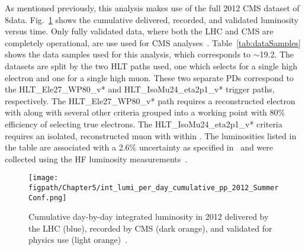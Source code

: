 As mentioned previously, this analysis makes use of the full 2012 CMS dataset of 8\tev data.
Fig.~\ref{fig:int_lumi_per_day} shows the cumulative delivered, recorded, and validated luminosity versus time.
Only fully validated data, where both the LHC and CMS are completely operational, are use used for CMS analyses~\cite{LumiPublic}.
Table~\ref{tab:dataSamples} shows the data samples used for this analysis, which corresponds to $\sim$19.2\fbinv.
The datasets are split by the two HLT paths used, one which selects for a single high \pt electron and one for a single high \pt muon.
These two separate PDs correspond to the HLT\_Ele27\_WP80\_v* and HLT\_IsoMu24\_eta2p1\_v* trigger paths, respectively.
The HLT\_Ele27\_WP80\_v* path requires a reconstructed electron with \gev along with several other criteria grouped into a working point with 80\% efficiency of selecting true electrons.
The HLT\_IsoMu24\_eta2p1\_v* criteria requires an isolated, reconstructed muon with \gev within .
The luminosities listed in the table are associated with a 2.6\% uncertainty as specified in~\cite{CMS-PAS-LUM-12-001} and were collected using the HF luminosity measurements~\cite{CMS-PAS-LUM-13-001}.

\begin{figure}[!hbt]
    \centering
    \texttt{[image: \\figpath/Chapter5/int\_lumi\_per\_day\_cumulative\_pp\_2012\_SummerConf.png]}
    \caption{Cumulative day-by-day integrated luminosity in 2012 delivered by the LHC (blue), recorded by CMS (dark orange), and validated for physics use (light orange)~\cite{DataQuality}.}
    \label{fig:int_lumi_per_day}
\end{figure}

